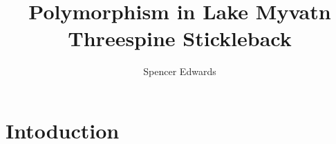 \documentclass[a4paper,10pt]{report}
\title{Polymorphism in Lake Myvatn Threespine Stickleback}
\author{Spencer Edwards}
\begin{document}
\maketitle


\tableofcontents{}
\begin{abstract}

\end{abstract}

\chapter{Intoduction}

\section{}
\end{document}
